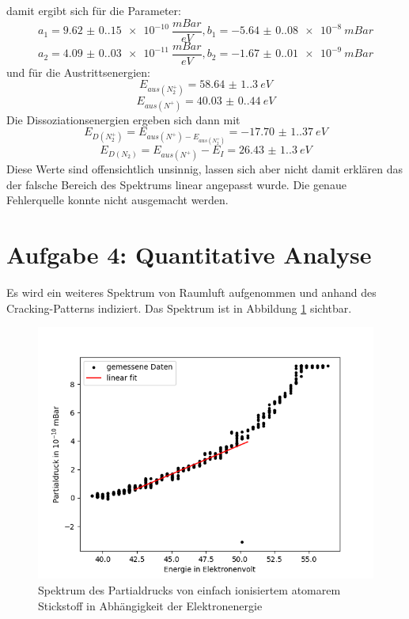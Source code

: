 damit ergibt sich für die Parameter: 
$$a_1 = \SI{ 9.62(0.15)e-10}{\frac{mBar}{eV}}, b_1 = \SI{-5.64(0.08)e-8}{mBar}$$
$$a_2 = \SI{4.09(0.03)e-11}{\frac{mBar}{eV}}, b_2 = \SI{-1.67(0.01)e-9}{mBar}$$
und für die Austrittsenergien: 
$$E_{aus(N_2^+)}= \SI{58.64(1.30)}{eV}$$
$$E_{aus(N^{+})}= \SI{40.03(0.44)}{eV}$$
Die Dissoziationsenergien ergeben sich dann mit
$$E_{D(N_2^+)} = E_{aus(N^+)-E_{aus(N_2^+)}} = \SI{-17.70(1.37)}{eV}$$
$$E_{D(N_2)} = E_{aus(N^+)} - E_I = \SI{26.43(1.30)}{eV}$$
Diese Werte sind offensichtlich unsinnig, lassen sich aber nicht damit erklären das der falsche Bereich des Spektrums linear angepasst wurde. Die genaue Fehlerquelle konnte nicht ausgemacht werden. 

\section{Aufgabe 4: Quantitative Analyse}
Es wird ein weiteres Spektrum von Raumluft aufgenommen und anhand des Cracking-Patterns\cite{VorbereitungsMappe} indiziert. 
Das Spektrum ist in Abbildung \ref{} sichtbar. 

\begin{figure}[H]
    \centering
    \includegraphics[width=120mm,scale=0.8]{Massenspektrometer/include/MSNDiss.png}
    \caption{Spektrum des Partialdrucks von einfach ionisiertem atomarem Stickstoff in Abhängigkeit der Elektronenergie}
    \label{fig:MSzweitesSpektrum}
\end{figure}


